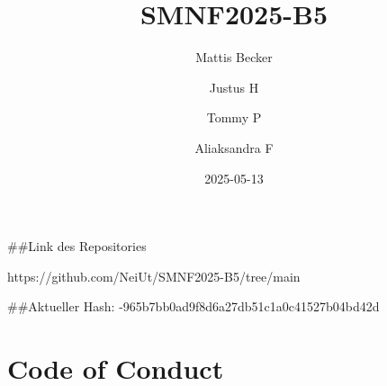 \documentclass[
  12pt,
  a4paper,
]{article}
\title{SMNF2025-B5}
\author{Mattis Becker \and Justus H \and Tommy P \and Aliaksandra F}
\date{2025-05-13}
\renewcommand*\contentsname{Table of contents}
\newcommand\contentsname{Table of contents}
\begin{document}
\maketitle

\renewcommand*\contentsname{Table of contents}
{
\hypersetup{linkcolor=}
\setcounter{tocdepth}{3}
\tableofcontents
}

\#\#Link des Repositories

https://github.com/NeiUt/SMNF2025-B5/tree/main

\#\#Aktueller Hash: -965b7bb0ad9f8d6a27db51c1a0c41527b04bd42d

\section{Code of Conduct}\label{code-of-conduct}
\end{document}

